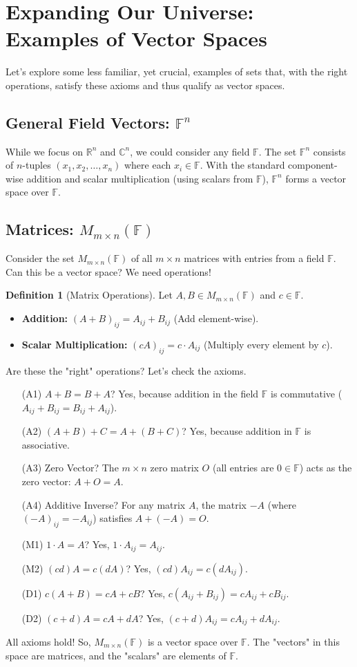 \documentclass[11pt]{article}
\theoremstyle{definition}
\newtheorem{definition}[theorem]{Definition}
\theoremstyle{remark}
\newcommand{\R}{\mathbb{R}}
\newcommand{\C}{\mathbb{C}}
\newcommand{\F}{\mathbb{F}} %
\newcommand{\Mat}[3]{M_{#1 \times #2}(#3)}
\begin{document}
\section{Expanding Our Universe: Examples of Vector Spaces}

Let's explore some less familiar, yet crucial, examples of sets that, with the right operations, satisfy these axioms and thus qualify as vector spaces.

\subsection{General Field Vectors: $\F^n$}
While we focus on $\R^n$ and $\C^n$, we could consider any field $\F$. The set $\F^n$ consists of $n$-tuples $(x_1, x_2, \dots, x_n)$ where each $x_i \in \F$. With the standard component-wise addition and scalar multiplication (using scalars from $\F$), $\F^n$ forms a vector space over $\F$.

\subsection{Matrices: $\Mat{m}{n}{\F}$}
Consider the set $\Mat{m}{n}{\F}$ of all $m \times n$ matrices with entries from a field $\F$. Can this be a vector space? We need operations!

\begin{definition}[Matrix Operations]
Let $A, B \in \Mat{m}{n}{\F}$ and $c \in \F$.
\begin{itemize}
    \item \textbf{Addition:} $(A+B)_{ij} = A_{ij} + B_{ij}$ (Add element-wise).
    \item \textbf{Scalar Multiplication:} $(c A)_{ij} = c \cdot A_{ij}$ (Multiply every element by $c$).
\end{itemize}
\end{definition}

Are these the "right" operations? Let's check the axioms.
\begin{itemize}
    \item[(A1)] $A+B = B+A$? Yes, because addition in the field $\F$ is commutative ($A_{ij}+B_{ij} = B_{ij}+A_{ij}$).
    \item[(A2)] $(A+B)+C = A+(B+C)$? Yes, because addition in $\F$ is associative.
    \item[(A3)] Zero Vector? The $m \times n$ zero matrix $O$ (all entries are $0 \in \F$) acts as the zero vector: $A + O = A$.
    \item[(A4)] Additive Inverse? For any matrix $A$, the matrix $-A$ (where $(-A)_{ij} = -A_{ij}$) satisfies $A + (-A) = O$.
    \item[(M1)] $1 \cdot A = A$? Yes, $1 \cdot A_{ij} = A_{ij}$.
    \item[(M2)] $(cd)A = c(dA)$? Yes, $(cd)A_{ij} = c(dA_{ij})$.
    \item[(D1)] $c(A+B) = cA+cB$? Yes, $c(A_{ij}+B_{ij}) = cA_{ij}+cB_{ij}$.
    \item[(D2)] $(c+d)A = cA+dA$? Yes, $(c+d)A_{ij} = cA_{ij}+dA_{ij}$.
\end{itemize}
All axioms hold! So, $\Mat{m}{n}{\F}$ is a vector space over $\F$. The "vectors" in this space are matrices, and the "scalars" are elements of $\F$.
\end{document}
